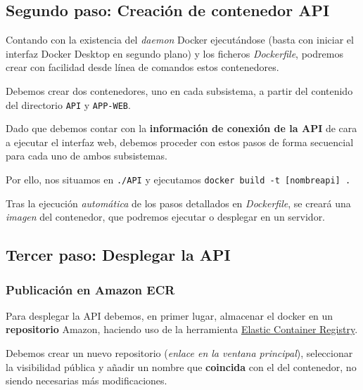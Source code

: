 
\subsection{Segundo paso: Creación de contenedor API}

Contando con la existencia del \textit{daemon} Docker ejecutándose (basta con iniciar el interfaz Docker Desktop en segundo plano) y los ficheros \textit{Dockerfile}, podremos crear con facilidad desde línea de comandos estos contenedores.

Debemos crear dos contenedores, uno en cada subsistema, a partir del contenido del directorio \texttt{API} y \texttt{APP-WEB}.

Dado que debemos contar con la \textbf{información de conexión de la API} de cara a ejecutar el interfaz web, debemos proceder con estos pasos de forma secuencial para cada uno de ambos subsistemas.

Por ello, nos situamos en \texttt{./API} y ejecutamos \texttt{docker build -t [nombreapi] .}

Tras la ejecución \textit{automática} de los pasos detallados en \textit{Dockerfile}, se creará una \textit{imagen} del contenedor, que podremos ejecutar o desplegar en un servidor.


\subsection{Tercer paso: Desplegar la API}

\subsubsection{Publicación en Amazon ECR}

Para desplegar la API debemos, en primer lugar, almacenar el docker en un \textbf{repositorio} Amazon, haciendo uso de la herramienta \href{https://aws.amazon.com/es/ecr/}{Elastic Container Registry}.

Debemos crear un nuevo repositorio (\textit{enlace en la ventana principal}), seleccionar la visibilidad pública y añadir un nombre que \textbf{coincida} con el del contenedor, no siendo necesarias más modificaciones.


